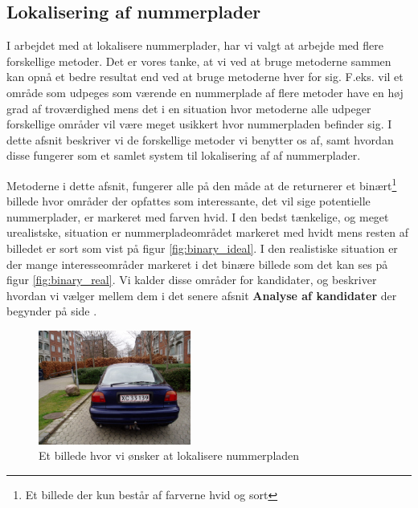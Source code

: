 \label{sec_billed}

\subsection{Lokalisering af nummerplader}



I arbejdet med at lokalisere nummerplader, har vi valgt at arbejde med flere forskellige metoder. Det er vores tanke, at vi ved at bruge metoderne sammen kan opnå et bedre resultat end ved at bruge metoderne hver for sig. F.eks. vil et område som udpeges som værende en nummerplade af flere metoder have en høj grad af troværdighed mens det i en situation hvor metoderne alle udpeger forskellige områder vil være meget usikkert hvor nummerpladen befinder sig. I dette afsnit beskriver vi de forskellige metoder vi benytter os af, samt hvordan disse fungerer som et samlet system til lokalisering af af nummerplader. 

Metoderne i dette afsnit, fungerer alle på den måde at de returnerer et binært\footnote{Et billede der kun består af farverne hvid og sort} billede hvor områder der opfattes som interessante, det vil sige potentielle nummerplader, er markeret med farven hvid. I den bedst tænkelige, og meget urealistske, situation er nummerpladeområdet markeret med hvidt mens resten af billedet er sort som vist på figur \vref{fig:binary_ideal}. I den realistiske situation er der mange interesseområder markeret i det binære billede som det kan ses på figur \vref{fig:binary_real}. Vi kalder disse områder for kandidater, og beskriver hvordan vi vælger mellem dem i det senere afsnit \textbf{Analyse af kandidater} der begynder på side \pageref{sec:kandidater}.

\begin{figure}[htp]
\centering
\includegraphics[width=5cm]{illu/B_XC33139.jpg}
\caption{Et billede hvor vi ønsker at lokalisere nummerpladen}
\label{fig:input_billede}
\end{figure}



